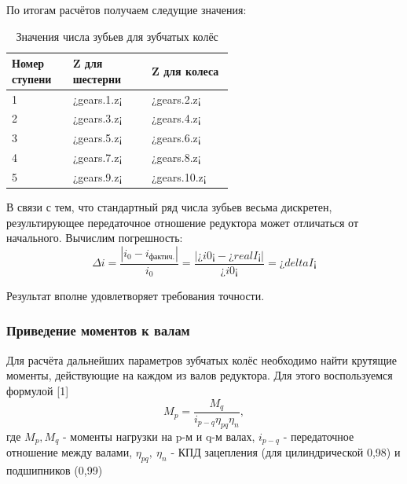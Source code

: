 \documentclass[14pt,a4paper,russian]{scrartcl}
\begin{document}
        По итогам расчётов получаем следущие значения:
        \begin{table}[h!]
            \begin{center}
                \begin{tabular}{p{0.13\linewidth}p{0.23\linewidth}p{0.2\linewidth}}
                    \hline
                    Номер ступени & Z для шестерни & Z для колеса \\
                    \hline
                    1   &   ¿gears.1.z¡ & ¿gears.2.z¡ \\
                    2   &   ¿gears.3.z¡ & ¿gears.4.z¡ \\
                    3   &   ¿gears.5.z¡ & ¿gears.6.z¡ \\
                    4   &   ¿gears.7.z¡ & ¿gears.8.z¡ \\
                    5   &   ¿gears.9.z¡ & ¿gears.10.z¡ \\
                    \hline
                \end{tabular}
                \caption{Значения числа зубьев для зубчатых колёс}\label{tab:gears_z}
            \end{center}
        \end{table}
        
        В связи с тем, что стандартный ряд числа зубьев весьма дискретен, 
        результирующее передаточное отношение редуктора может отличаться от начального.
        Вычислим погрешность:
        \[ \Delta i = \frac{|i_0 - i_{\text{фактич.}}|}{i_0} =  
            \frac{|¿i0¡-¿realI¡|}{¿i0¡} = ¿deltaI¡\]
        
        Результат вполне удовлетворяет требования точности.
        
    \subsubsection{Приведение моментов к валам}
        Для расчёта дальнейших параметров зубчатых колёс необходимо найти крутящие моменты,
        действующие на каждом из валов редуктора. Для этого воспользуемся формулой [1]
        \[ M_p = \frac{M_q}{i_{p-q}\eta_{pq}\eta_n}, \]
        где \( M_p, M_q \) - моменты нагрузки на p-м и q-м валах,
            \( i_{p-q} \) - передаточное отношение между валами,
            \( \eta_{pq},\ \eta_n \) - КПД зацепления (для цилиндрической 0,98) и подшипников (0,99)\par
        
\end{document}

